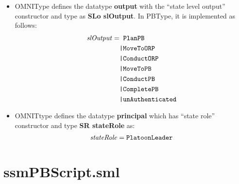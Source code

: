\begin{description}
\begin{itemize}
    \item OMNIType defines the datatype \textbf{output} with the “state level output” constructor
      and type as \textbf{SLo slOutput}.  In PBType, it is implemented as follows:
      \begin{align*}
        \mathit{slOutput} =&\;\; \texttt{PlanPB}\ \\
        &\texttt{|}{} \texttt{MoveToORP}\ \\
        &\texttt{|}{} \texttt{ConductORP}\ \\
        &\texttt{|}{} \texttt{MoveToPB}\ \\
        &\texttt{|}{} \texttt{ConductPB}\ \\
        &\texttt{|}{} \texttt{CompletePB}\ \\
        &\texttt{|}{} \texttt{unAuthenticated}
      \end{align*}

    \item OMNITtype defines the datatype \textbf{principal} which has “state role” constructor and
      type \textbf{SR stateRole} as:
      \begin{align*}
        \mathit{stateRole} = \texttt{PlatoonLeader}
      \end{align*}
  \end{itemize}
\end{description}

\section{ssmPBScript.sml}
\label{sec:ssmpbscript.sml}


